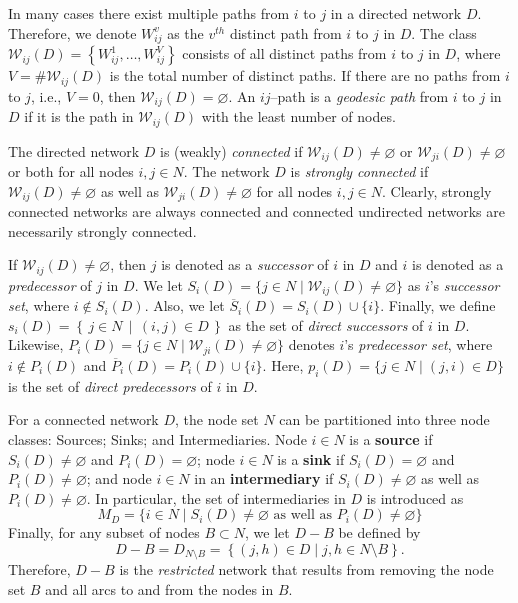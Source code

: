 In many cases there exist multiple paths from $i$ to $j$ in a directed network $D$. Therefore, we denote $W_{ij}^{v}$ as the $v^{th}$ distinct path from $i$ to $j$ in $D$. The class $\mathcal{W}_{ij} (D) = \left\{ W_{ij}^{1}, \ldots ,W_{ij}^{V} \right\}$ consists of all distinct paths from $i$ to $j$ in $D$, where $V = \# \mathcal{W}_{ij}(D)$ is the total number of distinct paths.  If there are no paths from $i$ to $j$, i.e., $V=0$, then $\mathcal{W}_{ij}(D)= \varnothing$. An $ij$--path is a \emph{geodesic path} from $i$ to $j$ in $D$ if it is the path in $\mathcal{W}_{ij} (D)$ with the least number of nodes.

The directed network $D$ is (weakly) \emph{connected} if $\mathcal{W}_{ij}(D) \neq \varnothing$ or $\mathcal{W}_{ji}(D) \neq \varnothing$ or both for all nodes $i,j \in N$. The network $D$ is \emph{strongly connected} if $\mathcal{W}_{ij}(D) \neq \varnothing$ as well as $\mathcal{W}_{ji}(D) \neq \varnothing$ for all nodes $i,j \in N$. Clearly, strongly connected networks are always connected and connected undirected networks are necessarily strongly connected.

If $\mathcal{W}_{ij} (D) \neq \varnothing$, then $j$ is denoted as a \textit{successor} of $i$ in $D$ and $i$ is denoted as a \textit{predecessor} of $j$ in $D$. We let $S_{i}(D)= \{j \in N \mid \mathcal{W}_{ij}(D) \neq \varnothing \}$ as $i$'s \textit{successor set}, where $i \notin S_{i}(D)$. Also, we let $\overline{S}_{i}(D) = S_{i}(D) \cup \{i\}$. Finally, we define $s_{i}(D) = \left\{\, j \in N \,\middle|\, (i,j) \in D \,\right\}$ as the set of \textit{direct successors} of $i$ in $D$. Likewise, $P_{i}(D)=\{j \in N \mid \mathcal{W}_{ji}(D) \neq \varnothing \}$ denotes $i$'s \textit{predecessor set}, where $i \notin P_{i}(D)$ and $\overline{P}_{i}(D) = P_{i}(D) \cup \{i\}$. Here, $p_{i}(D)=\{j \in N \mid (j,i) \in D\}$ is the set of \textit{direct predecessors} of $i$ in $D$.

For a connected network $D$, the node set $N$ can be partitioned into three node classes: Sources; Sinks; and Intermediaries. Node $i \in N$ is a \textbf{source} if $S_{i}(D) \neq \varnothing$ and $P_{i}(D) = \varnothing$; node $i \in N$ is a \textbf{sink} if $S_{i}(D) = \varnothing$ and $P_{i}(D) \neq \varnothing$; and node $i \in N$ in an \textbf{intermediary} if $S_{i}(D) \neq \varnothing$ as well as $P_{i}(D) \neq \varnothing$. In particular, the set of intermediaries in $D$ is introduced as
\begin{equation}
M_D = \{ i \in N \mid S_{i}(D) \neq \varnothing \mbox{ as well as } P_{i}(D) \neq \varnothing \}
\end{equation}
Finally, for any subset of nodes $B \subset N$, we let $D-B$ be defined by
\begin{equation}
D - B = D_{N \setminus B} = \left\{ (j,h) \in D \mid j,h \in N \setminus B \right\} .
\end{equation}
Therefore, $D - B$ is the \emph{restricted} network that results from removing the node set $B$ and all arcs to and from the nodes in $B$.

